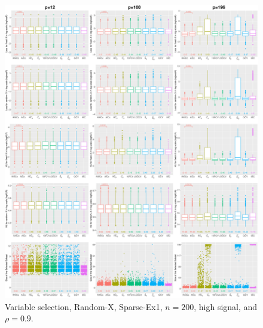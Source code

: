 \begin{figure}[!ht]
\centering
\includegraphics[width=\textwidth]{figures/supplement/randomx/subset_selection/Sparse-Ex1_n200_hsnr_rho09.eps}
\caption{Variable selection, Random-X, Sparse-Ex1, $n=200$, high signal, and $\rho=0.9$.}
\end{figure}
\clearpage
